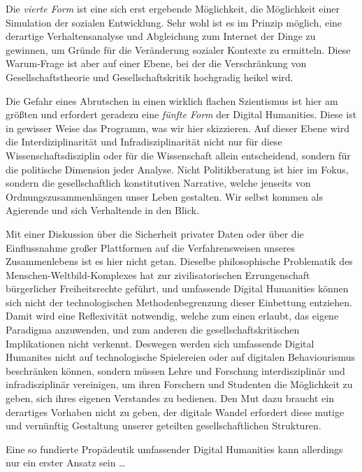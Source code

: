 \documentclass[a4paper,11pt]{article}
\begin{document}
Die \emph{vierte Form} ist eine sich erst ergebende Möglichkeit, die
Möglichkeit einer Simulation der sozialen Entwicklung. Sehr wohl ist es im
Prinzip möglich, eine derartige Verhaltensanalyse und Abgleichung zum Internet
der Dinge zu gewinnen, um Gründe für die Veränderung sozialer Kontexte zu
ermitteln. Diese Warum-Frage ist aber auf einer Ebene, bei der die
Verschränkung von Gesellschaftstheorie und Gesellschaftskritik hochgradig
heikel wird.

Die Gefahr eines Abrutschen in einen wirklich flachen Szientismus ist hier am
größten und erfordert geradezu eine \emph{fünfte Form} der Digital Humanities.
Diese ist in gewisser Weise das Programm, was wir hier skizzieren. Auf dieser
Ebene wird die Interdiziplinarität und Infradisziplinarität nicht nur für
diese Wissenschaftsdisziplin oder für die Wissenschaft allein entscheidend,
sondern für die politische Dimension jeder Analyse. Nicht Politikberatung ist
hier im Fokus, sondern die gesellschaftlich konstitutiven Narrative, welche
jenseits von Ordnungszusammenhängen unser Leben gestalten. Wir selbst kommen
als Agierende und sich Verhaltende in den Blick.

Mit einer Diskussion über die Sicherheit privater Daten oder über die
Einflussnahme großer Plattformen auf die Verfahrensweisen unseres
Zusammenlebens ist es hier nicht getan. Dieselbe philosophische Problematik
des Menschen-Weltbild-Komplexes hat zur zivilisatorischen Errungenschaft
bürgerlicher Freiheitsrechte geführt, und umfassende Digital Humanities können
sich nicht der technologischen Methodenbegrenzung dieser Einbettung
entziehen. Damit wird eine Reflexivität notwendig, welche zum einen erlaubt,
das eigene Paradigma anzuwenden, und zum anderen die gesellschaftskritischen
Implikationen nicht verkennt. Deswegen werden sich umfassende Digital
Humanites nicht auf technologische Spielereien oder auf digitalen
Behaviourismus beschränken können, sondern müssen Lehre und Forschung
interdisziplinär und infradisziplinär vereinigen, um ihren Forschern und
Studenten die Möglichkeit zu geben, sich ihres eigenen Verstandes zu
bedienen. Den Mut dazu braucht ein derartiges Vorhaben nicht zu geben, der
digitale Wandel erfordert diese mutige und vernünftig Gestaltung unserer
geteilten gesellschaftlichen Strukturen.

Eine so fundierte Propädeutik umfassender Digital Humanities kann allerdings
nur ein erster Ansatz sein \ldots

\ccnotice
\end{document}

